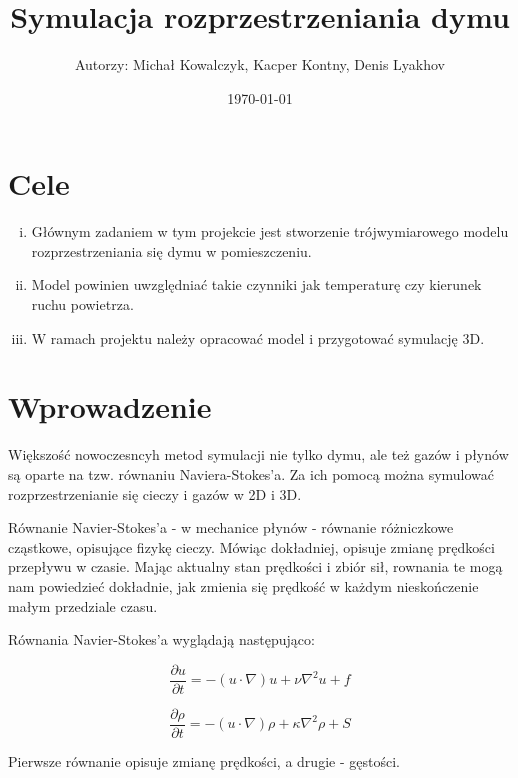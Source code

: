 \documentclass[a4paper,12pt]{article}
\title{Symulacja rozprzestrzeniania dymu}
\author{Autorzy: Michał Kowalczyk, Kacper Kontny, Denis Lyakhov}
\date{\today}
\begin{document}
	\maketitle
	
	\section{Cele}
	\begin{enumerate}[i.]
	    \item Głównym zadaniem w tym projekcie jest stworzenie trójwymiarowego modelu rozprzestrzeniania się dymu w pomieszczeniu.
        \item Model powinien uwzględniać takie czynniki jak temperaturę czy kierunek ruchu powietrza.
        \item W ramach projektu należy opracować model i przygotować symulację 3D.
	\end{enumerate}

	
	\section{Wprowadzenie}
	
	
	Większość nowoczesncyh metod symulacji nie tylko dymu, ale też gazów i
	płynów są oparte na tzw. równaniu Naviera-Stokes'a. Za ich pomocą można symulować rozprzestrzenianie się cieczy i gazów w 2D i 3D.
	
	\vspace{5mm}
	
	Równanie Navier-Stokes'a - w mechanice płynów - równanie różniczkowe
	cząstkowe, opisujące fizykę cieczy. Mówiąc dokładniej, opisuje
	zmianę prędkości przepływu w czasie. Mając aktualny stan prędkości i zbiór sił, rownania te mogą nam powiedzieć dokładnie, jak zmienia się prędkość w każdym nieskończenie małym przedziale czasu.
	
	Równania Navier-Stokes'a wyglądają następująco:
	
	\begin{equation}
	    \frac{\partial u}{\partial t} = -(u \cdot \nabla)u+\nu\nabla^{2}u+f
	\end{equation}
	
	\begin{equation}
	    \frac{\partial \rho}{\partial t}=-(u\cdot\nabla)\rho+\kappa\nabla^{2}\rho + S
	\end{equation}
	
	\vspace{5mm}

	Pierwsze równanie opisuje zmianę prędkości, a drugie - gęstości.
	
\end{document}
